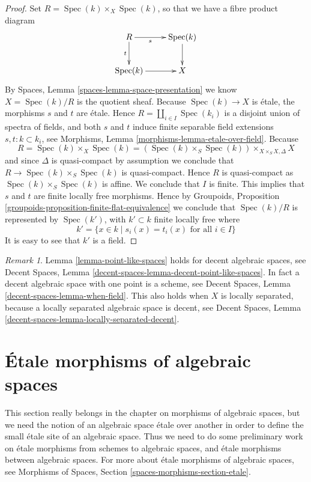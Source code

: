 \documentclass{stacks-project}
\theoremstyle{plain}
\theoremstyle{definition}
\theoremstyle{remark}
\newtheorem{remark}[subsection]{Remark}
\numberwithin{equation}{subsection}
\def\Spec{\mathop{\mathrm{Spec}}}
\begin{document}
\begin{proof}
Set $R = \Spec(k) \times_X \Spec(k)$, so that we have a
fibre product diagram
$$
\xymatrix{
R \ar[r]_-s \ar[d]_-t & \Spec(k) \ar[d] \\
\Spec(k) \ar[r] & X
}
$$
By
Spaces, Lemma \ref{spaces-lemma-space-presentation}
we know $X = \Spec(k)/R$ is the quotient sheaf.
Because $\Spec(k) \to X$ is \'etale, the morphisms $s$ and $t$ are
\'etale. Hence $R = \coprod_{i \in I} \Spec(k_i)$ is a disjoint
union of spectra of fields, and both $s$ and $t$
induce finite separable field extensions $s, t : k \subset k_i$, see
Morphisms, Lemma \ref{morphisms-lemma-etale-over-field}.
Because
$$
R = \Spec(k) \times_X \Spec(k)
= (\Spec(k) \times_S \Spec(k)) \times_{X \times_S X, \Delta} X
$$
and since $\Delta$ is quasi-compact by assumption we conclude that
$R \to \Spec(k) \times_S \Spec(k)$ is quasi-compact.
Hence $R$ is quasi-compact as $\Spec(k) \times_S \Spec(k)$ is
affine. We conclude that $I$ is finite. This implies
that $s$ and $t$ are finite locally free morphisms. Hence by
Groupoids, Proposition \ref{groupoids-proposition-finite-flat-equivalence}
we conclude that $\Spec(k)/R$ is
represented by $\Spec(k')$, with $k' \subset k$ finite locally free
where
$$
k' = \{x \in k \mid s_i(x) = t_i(x)\text{ for all }i \in I\}
$$
It is easy to see that $k'$ is a field.
\end{proof}

\begin{remark}
\label{remark-cannot-decide-yet}
Lemma \ref{lemma-point-like-spaces} holds for decent algebraic spaces, see
Decent Spaces, Lemma \ref{decent-spaces-lemma-decent-point-like-spaces}.
In fact a decent algebraic space with one point is a scheme, see
Decent Spaces, Lemma \ref{decent-spaces-lemma-when-field}.
This also holds when $X$ is locally separated, because a
locally separated algebraic space is decent, see
Decent Spaces, Lemma \ref{decent-spaces-lemma-locally-separated-decent}.
\end{remark}







\section{\'Etale morphisms of algebraic spaces}
\label{section-etale-morphisms}

\noindent
This section really belongs in the chapter on morphisms of algebraic
spaces, but we need the notion of an algebraic space \'etale over another
in order to define the small \'etale site of an algebraic space.
Thus we need to do some preliminary work on \'etale morphisms from schemes to
algebraic spaces, and \'etale morphisms between algebraic spaces.
For more about \'etale morphisms of algebraic spaces, see
Morphisms of Spaces, Section \ref{spaces-morphisms-section-etale}.
\end{document}
